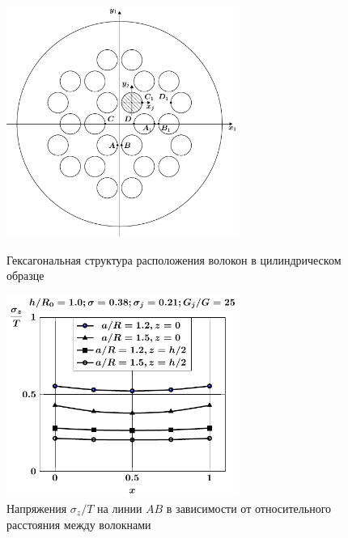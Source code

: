 \begin{figure}[h!]
\centering\footnotesize
\parbox[b]{7.5cm}{\centering\includegraphics[width=7.6cm]{inc-24.pdf}
\caption{Гексагональная структура расположения волокон в цилиндрическом образце
\label{f:7:146}}}\hfil\hfil
\parbox[b]{7.5cm}{\centering\includegraphics[width=7.6cm]{inc6-a-sig_z.pdf}
\caption{Напряжения $\sigma_z/T$ на линии $AB$ в зависимости от относительного расстояния между волокнами
\label{f:7:79}}}
\end{figure}

